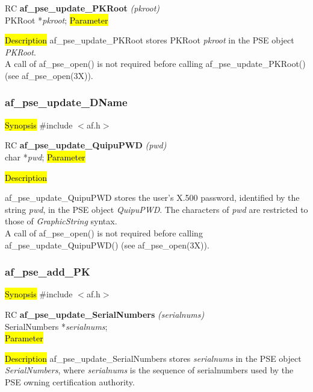 RC {\bf af\_pse\_update\_PKRoot} {\em (pkroot)} \\
PKRoot *{\em pkroot};
\hl{Parameter}


\hl{Description}
af\_pse\_update\_PKRoot stores PKRoot {\em pkroot} in the PSE object {\em PKRoot}.
\\ [1em]
A call of af\_pse\_open() is not required before calling af\_pse\_update\_PKRoot()
(see af\_pse\_open(3X)).

\subsubsection{af\_pse\_update\_DName}
\label{af_update_QuipuPWD}
\hl{Synopsis}
\#include $<$af.h$>$ 

RC {\bf af\_pse\_update\_QuipuPWD} {\em (pwd)} \\
char *{\em pwd};
\hl{Parameter}

\hl{Description}

af\_pse\_update\_QuipuPWD stores the user's X.500 password, identified by the string {\em pwd}, in the PSE object {\em QuipuPWD}. The characters of {\em pwd} are restricted to those of {\em GraphicString} syntax.  
\\ [1em]
A call of af\_pse\_open() is not required before calling af\_pse\_update\_QuipuPWD()
(see af\_pse\_open(3X)).


\subsubsection{af\_pse\_add\_PK}
\label{af_update_SerialNumbers}
\hl{Synopsis}
\#include $<$af.h$>$

RC {\bf af\_pse\_update\_SerialNumbers} {\em (serialnums)} \\
SerialNumbers *{\em serialnums}; \\
\hl{Parameter}

\hl{Description}
af\_pse\_update\_SerialNumbers stores {\em serialnums} in the PSE object {\em SerialNumbers},
where {\em serialnums} is the sequence of serialnumbers used by the PSE owning certification
authority. 

